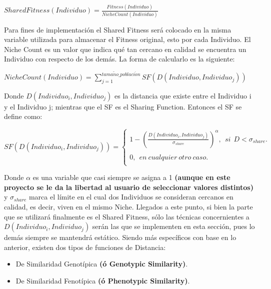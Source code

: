 \documentclass[class=report, crop=false]{standalone}
\begin{document}
\begin{center}\(SharedFitness(Individuo) = \frac{Fitness(Individuo)}{NicheCount(Individuo)}\)
\end{center}

Para fines de implementación el Shared Fitness será colocado en 
la misma variable utilizada para almacenar el Fitness original, 
esto por cada Individuo.\medskip\break
El Niche Count es un valor que indica qué tan cercano en calidad 
se encuentra un Individuo con respecto de los demás. La forma de 
calcularlo es la siguiente:

\begin{center}\(NicheCount(Individuo) = \sum_{j=1}^{tama\tilde{n}o\_poblaci\acute{o}n}SF(D(Individuo,Individuo_j))\)
\end{center}

Donde \(D(Individuo_i,Individuo_j)\) es la distancia que existe 
entre el Individuo i y el Individuo j; mientras que el SF es el 
Sharing Function.\break
Entonces el SF se define como:

\begin{center}\(SF(D(Individuo_i,Individuo_j)) = \left\{ \begin{array}{lcc}
              1 - (\frac{D(Individuo_i,Individuo_j)}{\sigma_{share}})^{\alpha},\ \ si\ \ D < \sigma_{share}. \\
              \\ 0,\ \ en\ cualquier\ otro\ caso. \\
         \end{array}
\right.\)
\end{center}

Donde \(\alpha\) es una variable que casi siempre se asigna a 
1 \textbf{(aunque en este proyecto se le da la libertad al usuario de seleccionar valores distintos)} y 
\(\sigma_{share}\) marca el límite en el cual dos Individuos se 
consideran cercanos en calidad, es decir, viven en el mismo Niche.\medskip\break
Llegados a este punto, si bien la parte que se utilizará finalmente 
es el Shared Fitness, sólo las técnicas concernientes a 
\(D(Individuo_i,Individuo_j)\) serán las que se implementen en esta 
sección, pues lo demás siempre se mantendrá estático.\break
Siendo más específicos con base en lo anterior, existen dos 
tipos de funciones de Distancia:

\begin{itemize}
\item De Similaridad Genotípica \textbf{(ó Genotypic Similarity)}.
\item De Similaridad Fenotípica \textbf{(ó Phenotypic Similarity)}.
\end{itemize}
\end{document}
